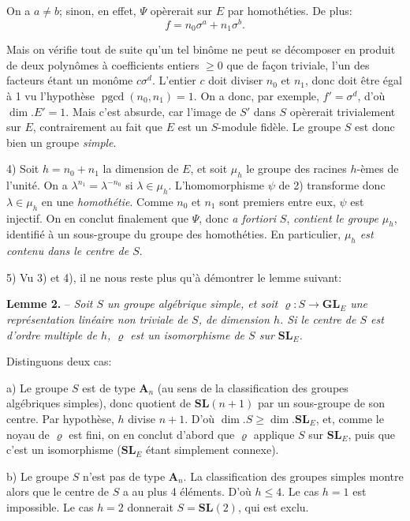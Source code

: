 On a $a\ne b$; sinon, en effet, $\Psi$ opèrerait sur $E$ par homothéties. De plus:
\[
f=n_0\sigma^a+n_1\sigma^b.
\]

Mais on vérifie tout de suite qu'un tel binôme ne peut se décomposer en produit de deux polynômes à coefficients entiers $\geq0$ que de façon triviale, l'un des facteurs étant un monôme $c\sigma^d$. L'entier $c$ doit diviser $n_0$ et $n_1$, donc doit être égal à 1 vu l'hypothèse $\operatorname{pgcd}(n_0,n_1)=1$. On a donc, par exemple, $f'=\sigma^d$, d'où $\dim.E'=1$. Mais c'est absurde, car l'image de $S'$ dans $S$ opèrerait trivialement sur $E$, contrairement au fait que $E$ est un $S$-module fidèle. Le groupe $S$ est donc bien un groupe \textit{simple}.

4) Soit $h=n_0+n_1$ la dimension de $E$, et soit $\mu_h$ le groupe des racines $h$-èmes de l'unité. On a $\lambda^{n_1}=\lambda^{-n_0}$ si $\lambda\in\mu_h$. L'homomorphisme $\psi$ de 2) transforme donc $\lambda\in\mu_h$ en une \textit{homothétie}. Comme $n_0$ et $n_1$ sont premiers entre eux, $\psi$ est injectif. On en conclut finalement que $\Psi$, donc \textit{a fortiori} $S$, \textit{contient le groupe $\mu_h$}, identifié à un sous-groupe du groupe des homothéties. En particulier, \textit{$\mu_h$ est contenu dans le centre de $S$}.

5) Vu 3) et 4), il ne nous reste plus qu'à démontrer le lemme suivant:

\textbf{Lemme 2.} -- \textit{Soit $S$ un groupe algébrique simple, et soit $\varrho:S\to\mathbf{GL}_E$ une représentation linéaire non triviale de $S$, de dimension $h$. Si le centre de $S$ est d'ordre multiple de $h$, $\varrho$ est un isomorphisme de $S$ sur $\mathbf{SL}_E$.}

Distinguons deux cas:

 a) Le groupe $S$ est de type $\mathbf A_n$ (au sens de la classification des groupes algébriques simples), donc quotient de $\mathbf{SL}(n+1)$ par un sous-groupe de son centre. Par hypothèse, $h$ divise $n+1$. D'où $\dim.S\geq\dim.\mathbf{SL}_E$, et, comme le noyau de $\varrho$ est fini, on en conclut d'abord que $\varrho$ applique $S$ sur $\mathbf{SL}_E$, puis que c'est un isomorphisme ($\mathbf{SL}_E$ étant simplement connexe).

 b) Le groupe $S$ n'est pas de type $\mathbf A_n$. La classification des groupes simples montre alors que le centre de $S$ a au plus 4 éléments. D'où $h\leq4$. Le cas $h=1$ est impossible. Le cas $h=2$ donnerait $S=\mathbf{SL}(2)$, qui est exclu.

